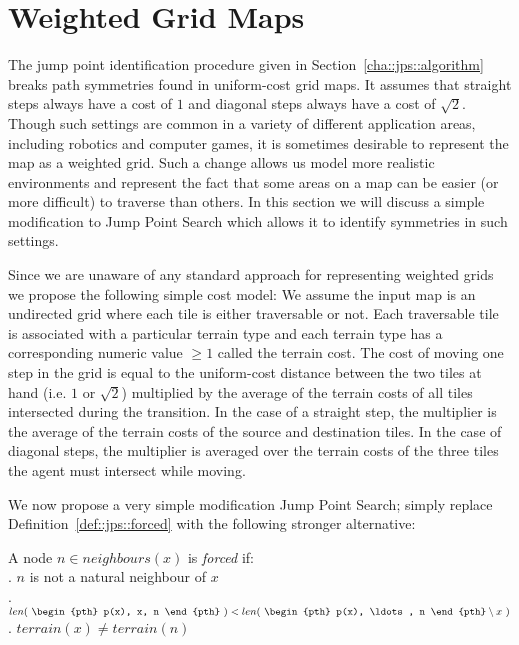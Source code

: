 \section{Weighted Grid Maps}
\label{cha::jps::weighted}

The jump point identification procedure given in
Section~\ref{cha::jps::algorithm} breaks path symmetries found in uniform-cost
grid maps. It assumes that straight steps always have a cost of $1$ and
diagonal steps always have a cost of $\sqrt{2}$.  Though such settings are
common in a variety of different application areas, including robotics and
computer games, it is sometimes desirable to represent the map as a weighted
grid. Such a change allows us model more realistic environments and represent
the fact that some areas on a map can be easier (or more difficult) to
traverse than others.  In this section we will discuss a simple modification
to  Jump Point Search which allows it to identify symmetries in such settings.

Since we are unaware of any standard approach for representing weighted grids
we propose the following simple cost model:
We assume the input map is an undirected grid where each tile is either
traversable or not.  Each traversable tile is associated with a particular
terrain type and each terrain type has a corresponding numeric value 
$\ge 1$ called the terrain cost.
The cost of moving one step in the grid is equal to the uniform-cost
distance between the two tiles at hand (i.e. $1$ or $\sqrt{2}$) multiplied by
the average of the terrain costs of all tiles intersected during the
transition.  In the case of a straight step, the multiplier is the average of
the terrain costs of the source and destination tiles. In the case of diagonal
steps, the multiplier is averaged over the terrain costs of the three tiles
the agent must intersect while moving.

We now propose a very simple modification Jump Point Search; 
simply replace Definition~\ref{def::jps::forced} with the following
stronger alternative:

\begin{definition}
\label{def::jps::wforced}
A node $n \in neighbours(x)$ is \emph{forced} if: \\
. $n$ is not a natural neighbour of $x$\\
. $ len(~\begin{pth} p(x), x, n \end{pth}~) < len(~ \begin{pth} p(x), \ldots, n \end{pth} \setminus x~)$ \\
. $terrain(x) \neq terrain(n)$
\end{definition}

